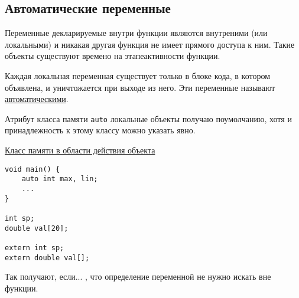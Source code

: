 \subsection{Автоматические переменные}

Переменные декларируемые внутри функции являются внутреними (или локальными) и никакая другая функция не имеет прямого доступа к ним. Такие объекты существуют времено на этапеактивности функции.

Каждая локальная переменная существует только в блоке кода, в котором объявлена, и уничтожается при выходе из него. Эти переменные называют \underline{автоматическими}.

Атрибут класса памяти \texttt{auto} локальные объекты получаю поумолчанию, хотя и принадлежность к этому классу можно указать явно.

\underline{Класс памяти в области действия объекта}

\begin{verbatim}
void main() {
    auto int max, lin;
    ...
}

int sp;
double val[20];

extern int sp;
extern double val[];
\end{verbatim}

Так получают, если... , что определение переменной не нужно искать вне функции.